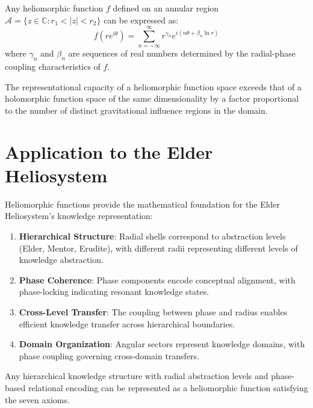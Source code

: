 \begin{theorem}
Any heliomorphic function $f$ defined on an annular region $\mathcal{A} = \{z \in \mathbb{C} : r_1 < |z| < r_2\}$ can be expressed as:
\begin{equation}
f(re^{i\theta}) = \sum_{n=-\infty}^{\infty} r^{\gamma_n} e^{i(n\theta + \beta_n \ln r)}
\end{equation}
where $\gamma_n$ and $\beta_n$ are sequences of real numbers determined by the radial-phase coupling characteristics of $f$.
\end{theorem}

\begin{theorem}
The representational capacity of a heliomorphic function space exceeds that of a holomorphic function space of the same dimensionality by a factor proportional to the number of distinct gravitational influence regions in the domain.
\end{theorem}

\section{Application to the Elder Heliosystem}

Heliomorphic functions provide the mathematical foundation for the Elder Heliosystem's knowledge representation:

\begin{enumerate}
    \item \textbf{Hierarchical Structure}: Radial shells correspond to abstraction levels (Elder, Mentor, Erudite), with different radii representing different levels of knowledge abstraction.
    
    \item \textbf{Phase Coherence}: Phase components encode conceptual alignment, with phase-locking indicating resonant knowledge states.
    
    \item \textbf{Cross-Level Transfer}: The coupling between phase and radius enables efficient knowledge transfer across hierarchical boundaries.
    
    \item \textbf{Domain Organization}: Angular sectors represent knowledge domains, with phase coupling governing cross-domain transfers.
\end{enumerate}

\begin{theorem}
Any hierarchical knowledge structure with radial abstraction levels and phase-based relational encoding can be represented as a heliomorphic function satisfying the seven axioms.
\end{theorem}

